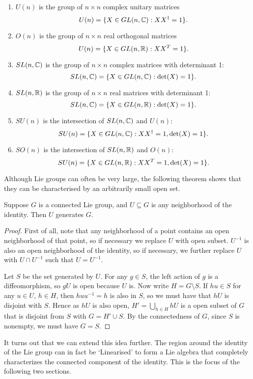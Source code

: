 \documentclass[a4paper]{article}
\begin{document}
\begin{enumerate}
    \item $U(n)$ is the group of $n\times n$ complex unitary matrices 
    $$U(n) = \{X \in GL(n, \mathbb{C}) : XX^\dagger = 1\}.$$
    \item $O(n)$ is the group of $n\times n$ real orthogonal matrices 
    $$U(n) = \{X \in GL(n, \mathbb{R}) : XX^T = 1\}.$$
    \item $SL(n, \mathbb{C})$ is the group of $n\times n$ complex matrices with determinant 1:
    $$SL(n, \mathbb{C}) = \{X \in GL(n, \mathbb{C}) : \det(X) = 1\}.$$
    \item $SL(n, \mathbb{R})$ is the group of $n\times n$ real matrices with determinant 1:
    $$SL(n, \mathbb{C}) = \{X \in GL(n, \mathbb{R}) : \det(X) = 1\}.$$
    \item $SU(n)$ is the intersection of $SL(n, \mathbb{C})$ and $U(n)$:
    $$SU(n) = \{X \in GL(n, \mathbb{C}) : XX^\dagger = 1, \det(X) = 1\}.$$
    \item $SO(n)$ is the intersection of $SL(n, \mathbb{R})$ and $O(n)$:
    $$SU(n) = \{X \in GL(n, \mathbb{R}) : XX^T = 1, \det(X) = 1\}.$$
\end{enumerate}

Although Lie groups can often be very large, the following theorem shows that they can be characterised by an arbitrarily small open set.

\begin{thm}
    Suppose $G$ is a connected Lie group, and $U \subseteq G$ is any neighborhood of the identity. Then $U$ generates $G$.
\end{thm}

\begin{proof}
First of all, note that any neighborhood of a point contains an open neighborhood of that point, so if necessary we replace $U$ with open subset. $U^{-1}$ is also an open neighborhood of the identity, so if necessary, we further replace $U$ with $U \cap U^{-1}$ such that $U=U^{-1}$.

Let $S$ be the set generated by $U$. For any $g \in S$, the left action of $g$ is a diffeomorphism, so $gU$ is open because $U$ is. Now write $H = G \setminus S$. If $hu \in S$ for any $u \in U$, $h \in H$, then $huu^{-1} = h$ is also in $S$, so we must have that $hU$ is disjoint with $S$. Hence as $hU$ is also open, $H' = \bigcup_{h \in H} hU$ is a open subset of $G$ that is disjoint from $S$ with $G = H' \cup S$. By the connectedness of $G$, since $S$ is nonempty, we must have $G=S$. 
\end{proof}

It turns out that we can extend this idea further. The region around the identity of the Lie group can in fact be `Linearised' to form a Lie algebra that completely characterizes the connected component of the identity. This is the focus of the following two sections.
\end{document}
